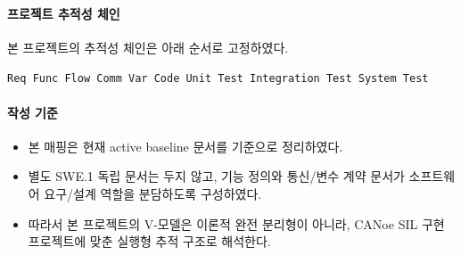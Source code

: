 \paragraph{프로젝트 추적성 체인}
본 프로젝트의 추적성 체인은 아래 순서로 고정하였다.

\begin{center}
\texttt{Req \textrightarrow{} Func \textrightarrow{} Flow \textrightarrow{} Comm \textrightarrow{} Var \textrightarrow{} Code \textrightarrow{} Unit Test \textrightarrow{} Integration Test \textrightarrow{} System Test}
\end{center}

\paragraph{작성 기준}
\begin{itemize}
\item 본 매핑은 현재 active baseline 문서를 기준으로 정리하였다.
\item 별도 SWE.1 독립 문서는 두지 않고, 기능 정의와 통신/변수 계약 문서가 소프트웨어 요구/설계 역할을 분담하도록 구성하였다.
\item 따라서 본 프로젝트의 V-모델은 이론적 완전 분리형이 아니라, CANoe SIL 구현 프로젝트에 맞춘 실행형 추적 구조로 해석한다.
\end{itemize}
